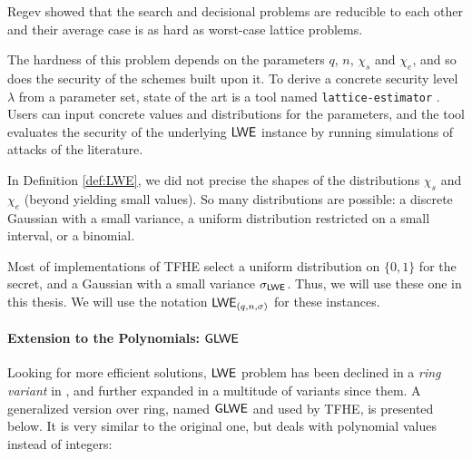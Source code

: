 Regev showed that the search and decisional problems are reducible to each other and their average case is as hard as worst-case lattice problems.

The hardness of this problem depends on the parameters $q$, $n$, $\chi_s$ and $\chi_e$, and so does the security of the schemes built upon it. To derive a concrete security level $\lambda$ from a parameter set, state of the art is a tool named \texttt{lattice-estimator} \cite{lattice-estimator}. Users can input concrete values and distributions for the parameters, and the tool evaluates the security of the underlying $\textsf{LWE}$ instance by running simulations of attacks of the literature.

In Definition \ref{def:LWE}, we did not precise the shapes of the distributions $\chi_s$ and $\chi_e$ (beyond yielding small values). So many distributions are possible: a discrete Gaussian with a small variance, a uniform distribution restricted on a small interval, or a binomial. 

Most of implementations of TFHE select a uniform distribution on $\{0, 1\}$ for the secret, and a Gaussian with a small variance $\sigma_{\textsf{LWE}}$. Thus, we will use these one in this thesis. We will use the notation $\textsf{LWE}_{(q, n, \sigma)}$ for these instances.



\paragraph{Extension to the Polynomials: $\textsf{GLWE}$}


Looking for more efficient solutions, $\textsf{LWE}$ problem has been declined in a \textit{ring variant} in \cite{rlwe}, and further expanded in a multitude of variants since them. A generalized version over ring, named $\textsf{GLWE}$ and used by TFHE, is presented below. It is very similar to the original one, but deals with polynomial values instead of integers:

